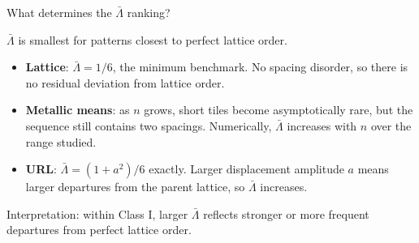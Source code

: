 \documentclass[aspectratio=169, 11pt]{beamer}
\begin{document}
\begin{frame}{What determines the $\bar\Lambda$ ranking?}

$\bar\Lambda$ is smallest for patterns closest to perfect lattice order.

\medskip
\begin{itemize}
  \item \textbf{Lattice}: $\bar\Lambda = 1/6$, the minimum benchmark.
        No spacing disorder, so there is no residual deviation from lattice order.

  \item \textbf{Metallic means}: as $n$ grows, short tiles become asymptotically rare,
        but the sequence still contains two spacings.
        Numerically, $\bar\Lambda$ increases with $n$ over the range studied.

  \item \textbf{URL}: $\bar\Lambda = (1+a^2)/6$ exactly.
        Larger displacement amplitude $a$ means larger departures from the parent lattice,
        so $\bar\Lambda$ increases.
\end{itemize}

\medskip
\centering
\colorbox{newbg}{\parbox{0.88\linewidth}{\centering
  Interpretation: within Class I, larger $\bar\Lambda$ reflects stronger or more frequent
  departures from perfect lattice order.
}}

\end{frame}
\end{document}
